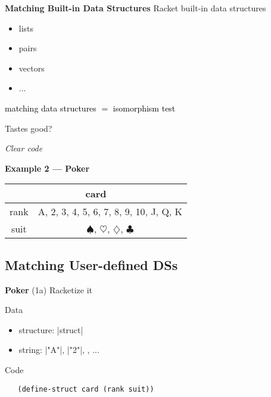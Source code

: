 \documentclass[14pt]{beamer}
\newcommand{\hl}[1]{\textcolor{black}{#1}}
\begin{document}
\begin{frame}{\bf Matching Built-in Data Structures}
 Racket built-in data structures
 \begin{itemize}
  \item lists
  \pause
  \item pairs
  \pause
  \item vectors
  \item ...
 \end{itemize}

 \pause

 \hl{matching data structures $=$ isomorphism test}
\end{frame}

\begin{frame}[plain]
 \begin{center}
  {\LARGE
   Tastes good?
   
   \pause

   \em
   Clear code
  }
 \end{center}
\end{frame}

\begin{frame}[fragile]{\bf Example 2 --- Poker}
 \large
 \begin{table}
  \centering
  \begin{tabular}{c|c}
   \hline
   \multicolumn{2}{c}{card} \\
   \hline
   rank & A, 2, 3, 4, 5, 6, 7, 8, 9, 10, J, Q, K \\
   \hline
   suit & $\spadesuit$, $\heartsuit$, $\diamondsuit$, $\clubsuit$ \\
   \hline
  \end{tabular}
 \end{table}
\end{frame}

\subsection{Matching User-defined DSs}

\begin{frame}[fragile]{{\bf Poker} (1a)}
 Racketize it

 \pause

 Data
 \begin{itemize}
  \item structure: |struct|
  \pause
  \item string: |"A"|, |"2"|, \color{strcol}{\verb|"|$\spadesuit$\verb|"|}, ...
 \end{itemize}

 \pause

 Code
 {\footnotesize
  \begin{verbatim}
   (define-struct card (rank suit))
  \end{verbatim}
 }
\end{frame}
\end{document}
